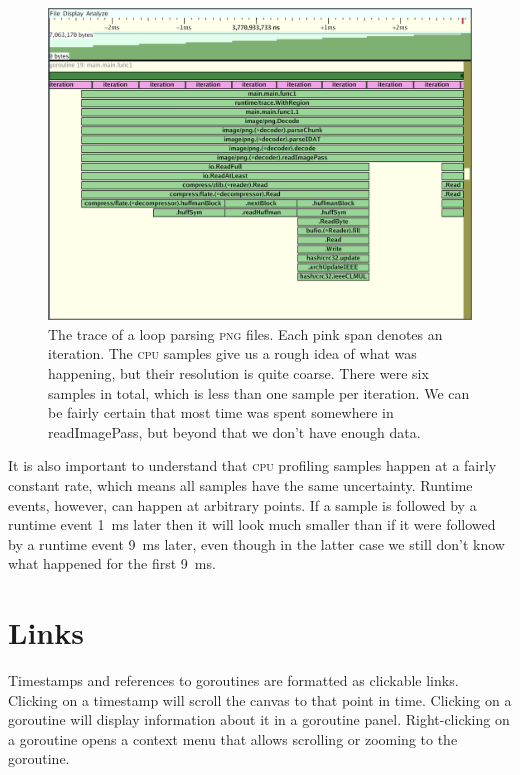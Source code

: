 \documentclass[10pt,letterpaper,oneside,openany,english]{memoir}
\newcommand{\code}[1]{{\ttfamily\mbox{#1}}}
\begin{document}
\begin{figure}[h]
\includegraphics[width=\textwidth]{images/screenshots/sampling.png}
\caption{
  The trace of a loop parsing \textsc{png} files.
  Each pink span denotes an iteration.
  The \textsc{cpu} samples give us a rough idea of what was happening, but their resolution is quite coarse.
  There were six samples in total, which is less than one sample per iteration.
  We can be fairly certain that most time was spent somewhere in \code{readImagePass}, but beyond that we don't have enough data.
}
\end{figure}

It is also important to understand that \textsc{cpu} profiling samples happen at a fairly constant rate, which means all samples have the same uncertainty.
Runtime events, however, can happen at arbitrary points.
If a sample is followed by a runtime event \qty{1}{\milli\second} later then it will look much smaller than if it were followed by a runtime event \qty{9}{\milli\second} later,
even though in the latter case we still don't know what happened for the first \qty{9}{\milli\second}. 

\section{Links}

Timestamps and references to goroutines are formatted as clickable links.
Clicking on a timestamp will scroll the canvas to that point in time.
Clicking on a goroutine will display information about it in a goroutine panel.
Right-clicking on a goroutine opens a context menu that allows scrolling or zooming to the goroutine.
\end{document}
